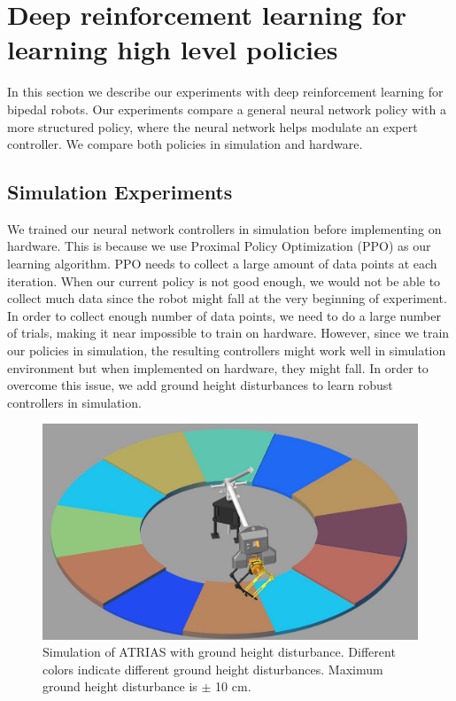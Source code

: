 

\section{Deep reinforcement learning for learning high level policies}
In this section we describe our experiments with deep reinforcement learning for bipedal robots. Our experiments compare a general neural network policy with a more structured policy, where the neural network helps modulate an expert controller. We compare both policies in simulation and hardware.

\subsection{Simulation Experiments}
We trained our neural network controllers in simulation before implementing on hardware. This is because we use Proximal Policy Optimization (PPO) as our learning algorithm. PPO needs to collect a large amount of data points at each iteration. When our current policy is not good enough, we would not be able to collect much data since the robot might fall at the very beginning of experiment. In order to collect enough number of data points, we need to do a large number of trials, making it near impossible to train on hardware. However, since we train our policies in simulation, the resulting controllers might work well in simulation environment but when implemented on hardware, they might fall. In order to overcome this issue, we add ground height disturbances to learn robust controllers in simulation. %

\begin{figure}[t]
	\centering
	\includegraphics[width=.55\textwidth]{img/simulator.PNG}
    \caption{Simulation of ATRIAS with ground height disturbance. Different colors indicate different ground height disturbances. Maximum ground height disturbance is $\pm$ 10 cm. }
    \label{fig:process}
\end{figure}

